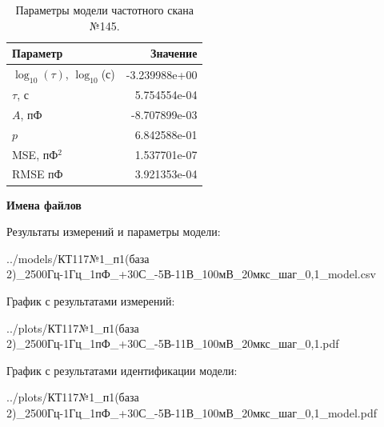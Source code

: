 \begin{table}[!ht]
    \centering
    \caption{Параметры модели частотного скана №145.}
    \begin{tabular}{|l|r|}
        \hline
        Параметр                                       & Значение                  \\ \hline
        $\log_{10}(\tau)$, $\log_{10}$(с)              & -3.239988e+00             \\ \hline
        $\tau$, с                                      & 5.754554e-04              \\ \hline
        $A$, пФ                                        & -8.707899e-03             \\ \hline
        $p$                                            & 6.842588e-01              \\ \hline
        MSE, пФ$^2$                                    & 1.537701e-07              \\ \hline
        RMSE пФ                                        & 3.921353e-04              \\ \hline
    \end{tabular}
    \label{table:frequency_scan_model_145}
\end{table}

\textbf{Имена файлов}

Результаты измерений и параметры модели:

\scriptsize../models/КТ117№1\_п1(база 2)\_2500Гц-1Гц\_1пФ\_+30С\_-5В-11В\_100мВ\_20мкс\_шаг\_0,1\_model.csv
\normalsize

График с результатами измерений:

\scriptsize../plots/КТ117№1\_п1(база 2)\_2500Гц-1Гц\_1пФ\_+30С\_-5В-11В\_100мВ\_20мкс\_шаг\_0,1.pdf
\normalsize

График с результатами идентификации модели:

\scriptsize../plots/КТ117№1\_п1(база 2)\_2500Гц-1Гц\_1пФ\_+30С\_-5В-11В\_100мВ\_20мкс\_шаг\_0,1\_model.pdf
\normalsize

